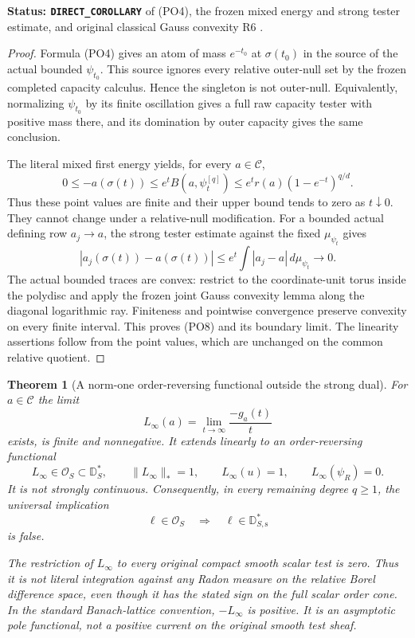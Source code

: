 \documentclass[11pt,a4paper]{article}
\numberwithin{equation}{section}
\newtheorem{theorem}{Theorem}[section]
\theoremstyle{definition}
\theoremstyle{remark}
\begin{document}
\noindent\textbf{Status: \texttt{DIRECT\_COROLLARY}} of
\textup{(PO4)}, the frozen mixed energy and strong tester
estimate, and original classical Gauss convexity R6
.

\begin{proof}
Formula \textup{(PO4)} gives an atom of mass $e^{-t_0}$
at $\sigma(t_0)$ in the source of the actual bounded
$\psi_{t_0}$.  This source ignores every relative
outer-null set by the frozen completed capacity calculus.
Hence the singleton is not outer-null.  Equivalently,
normalizing $\psi_{t_0}$ by its finite oscillation gives
a full raw capacity tester with positive mass there,
and its domination by outer capacity gives the same
conclusion.

The literal mixed first energy yields, for every
$a\in\mathscr C$,
\[
 0\le -a(\sigma(t))
     \le e^t B(a,\psi_t^{[q]})
     \le e^t r(a)(1-e^{-t})^{q/d}.
 \tag{PO9}
\]
Thus these point values are finite and their upper bound
tends to zero as $t\downarrow0$.  They cannot change
under a relative-null modification.  For a bounded
actual defining row $a_j\to a$, the strong tester
estimate against the fixed $\mu_{\psi_t}$ gives
\[
 |a_j(\sigma(t))-a(\sigma(t))|
       \le e^t\int|a_j-a|\,d\mu_{\psi_t}\longrightarrow0.
\]
The actual bounded traces are convex: restrict to the
coordinate-unit torus inside the polydisc and apply the
frozen joint Gauss convexity lemma along the diagonal
logarithmic ray.  Finiteness and pointwise convergence
preserve convexity on every finite interval.  This
proves \textup{(PO8)} and its boundary limit.  The
linearity assertions follow from the point values,
which are unchanged on the common relative quotient.
\end{proof}

\begin{theorem}[A norm-one order-reversing functional outside the strong dual]
\label{thm:r12-pole-order-dual-not-strong}
For $a\in\mathscr C$ the limit
\[
                    L_\infty(a)=
                         \lim_{t\to\infty}\frac{-g_a(t)}t
 \tag{PO10}
\]
exists, is finite and nonnegative.  It extends linearly
to an order-reversing functional
\[
 L_\infty\in\mathscr O_S\subset\mathbb D_S^*,\qquad
 \|L_\infty\|_*=1,\qquad
 L_\infty(u)=1,\qquad L_\infty(\psi_R)=0.
 \tag{PO11}
\]
It is not strongly continuous.  Consequently, in every
remaining degree $q\ge1$, the universal implication
\[
          \ell\in\mathscr O_S\quad\Longrightarrow\quad
                   \ell\in\mathbb D_{S,\mathrm s}^*
 \tag{PO12}
\]
is false.

The restriction of $L_\infty$ to every original compact
smooth scalar test is zero.  Thus it is not literal
integration against any Radon measure on the relative
Borel difference space, even though it has the stated
sign on the full scalar order cone.  In the standard
Banach-lattice convention, $-L_\infty$ is positive.
It is an asymptotic pole
functional, not a positive current on the original
smooth test sheaf.
\end{theorem}
\end{document}
